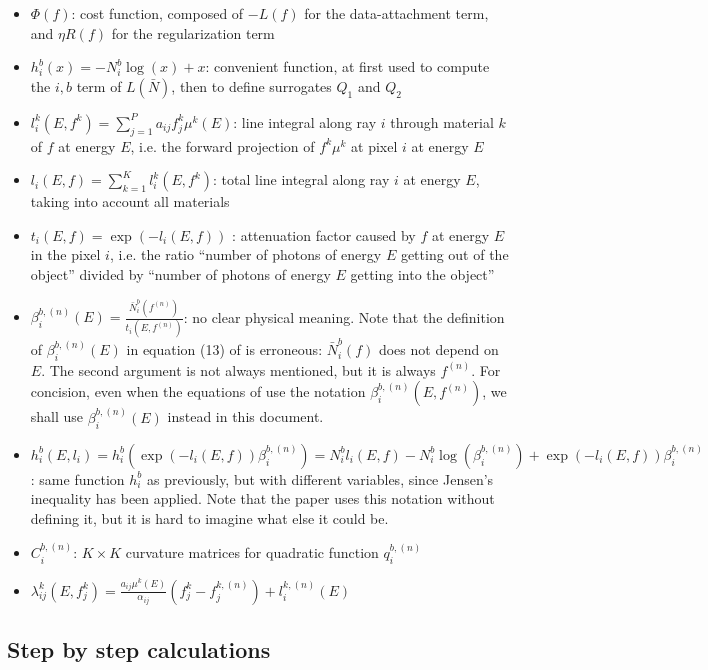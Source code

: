 \documentclass[a4paper, 10pt]{article}
\begin{document}
\begin{itemize}
  \item $\Phi(f)$: cost function, composed of $-L(f)$ for the data-attachment term, and $\eta R(f)$ for the regularization term
  \item $h_i^b(x) = -N_i^b \log(x) + x$: convenient function, at first used to compute the $i,b$ term of $L(\bar{N})$, then to define surrogates $Q_1$ and $Q_2$
  \item $l_i^k(E, f^k) = \sum_{j=1}^P a_{ij}f_j^k\mu^k(E)$: line integral along ray $i$ through material $k$ of $f$ at energy $E$, i.e. the forward projection of $f^k \mu^k$ at pixel $i$ at energy $E$
  \item $l_i(E, f) = \sum_{k=1}^K l_i^k(E, f^k)$: total line integral along ray $i$ at energy $E$, taking into account all materials
  \item $t_i(E,f) = \exp(-l_i(E, f))$ : attenuation factor caused by $f$ at energy $E$ in the pixel $i$, i.e. the ratio ``number of photons of energy $E$ getting out of the object'' divided by ``number of photons of energy $E$ getting into the object''
  \item $\beta_i^{b, (n)}(E)= \frac{\bar{N}_i^b(f^{(n)})}{t_i(E,f^{(n)})}$: no clear physical meaning. Note that the definition of $\beta_i^{b, (n)}(E)$ in equation (13) of \cite{weidinger_polychromatic_2016} is erroneous: $\bar{N}_i^b(f)$ does not depend on $E$. The second argument
  is not always mentioned, but it is always $f^{(n)}$. For concision, even when the equations of \cite{weidinger_polychromatic_2016} use the notation $\beta_i^{b, (n)}(E,f^{(n)})$, we shall use $\beta_i^{b, (n)}(E)$ instead in this document. 
  \item $h_i^b(E, l_i) = h_i^b( \exp(-l_i(E,f)) \beta_i^{b, (n)} ) = N_i^b l_i(E,f) - N_i^b \log(\beta_i^{b, (n)}) + \exp(-l_i(E,f)) \beta_i^{b, (n)}$: same function $h_i^b$ as previously, 
  but with different variables, since Jensen's inequality has been applied. Note that the paper uses this notation without defining it, but it is hard to imagine what else it could be.
  \item $C_i^{b, (n)}$: $ K \times K$ curvature matrices for quadratic function $q_i^{b, (n)}$
  \item $\lambda_{ij}^k \left(E, f_j^k \right) = \frac{a_{ij}\mu^k(E)}{\alpha_{ij}}\left(f_j^k - f_j^{k, (n)} \right) + l_i^{k,(n)}(E)$
\end{itemize}

\subsection{Step by step calculations}
\end{document}
